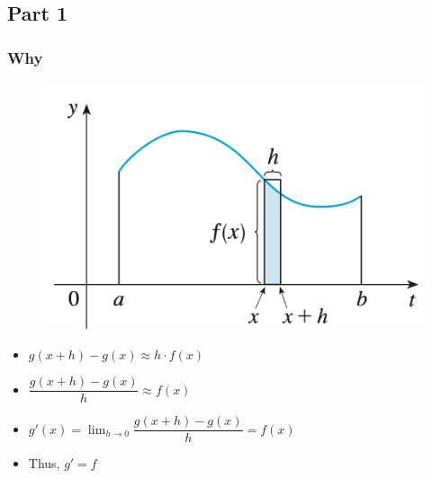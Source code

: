 \documentclass[t]{beamer}
\theoremstyle{plain}
\theoremstyle{definition}
\newcommand{\ds}{\displaystyle}
\begin{document}
\subsection{Part 1}

\begin{frame}

\frametitle{Why}

\begin{figure}
\begin{center}
\includegraphics[scale=0.27]{fig/ftc1}
\end{center}
\end{figure}

\begin{itemize}
\item $g(x + h) - g(x) \approx h \cdot f(x)$\\
\item $\dfrac{g(x+h)-g(x)}{h} \approx f(x)$
\item $g'(x) = \ds\lim_{h\rightarrow 0} \dfrac{g(x+h)-g(x)}{h} = f(x)$ 
\item Thus, $g' = f$
\end{itemize}

\end{frame}
\end{document}
